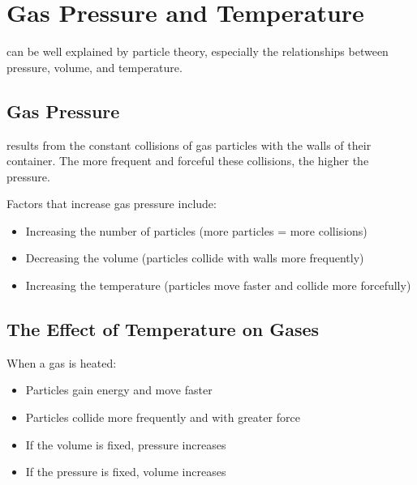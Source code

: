 
\section{Gas Pressure and Temperature}

 can be well explained by particle theory, especially the relationships between pressure, volume, and temperature.

\subsection{Gas Pressure}

 results from the constant collisions of gas particles with the walls of their container. The more frequent and forceful these collisions, the higher the pressure.

Factors that increase gas pressure include:
\begin{itemize}
    \item Increasing the number of particles (more particles = more collisions)
    \item Decreasing the volume (particles collide with walls more frequently)
    \item Increasing the temperature (particles move faster and collide more forcefully)
\end{itemize}


\subsection{The Effect of Temperature on Gases}

When a gas is heated:
\begin{itemize}
    \item Particles gain energy and move faster
    \item Particles collide more frequently and with greater force
    \item If the volume is fixed, pressure increases
    \item If the pressure is fixed, volume increases
\end{itemize}

